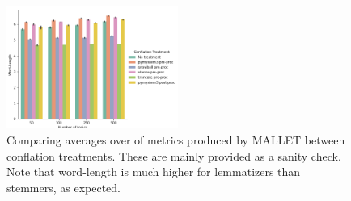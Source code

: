 \documentclass[11pt,a4paper]{article}
\begin{document}
\begin{figure}[!th]
    \includegraphics[width=0.5\textwidth]{word-length.png}
    \caption{Comparing averages over of metrics produced by MALLET between conflation treatments. These are mainly provided as a sanity check. Note that word-length is much higher for lemmatizers than stemmers, as expected.}
    \label{fig:slot_lemma_figs}
\end{figure}
\end{document}
